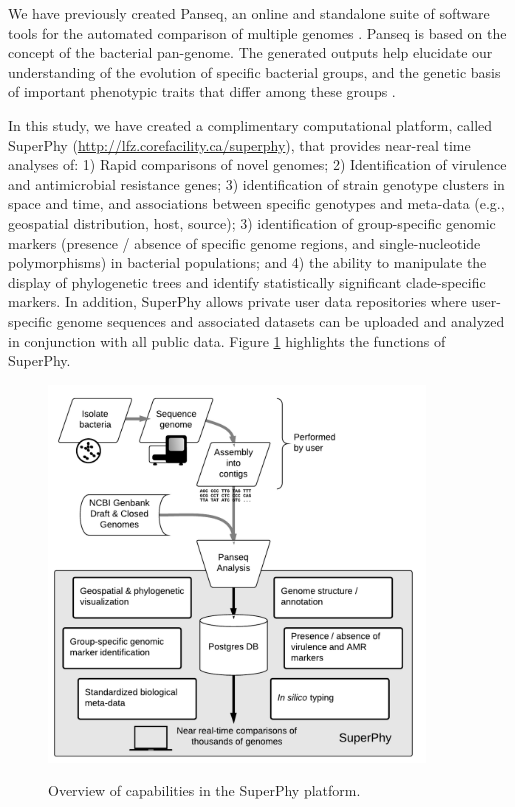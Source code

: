 \documentclass[a4paper,twoside]{article}
\begin{document}
We have previously created Panseq, an online and standalone suite of software tools for the automated comparison of multiple genomes \cite{laing_pan-genome_2010,laing_identification_2011}. Panseq is based on the concept of the bacterial pan-genome. The generated outputs help elucidate our understanding of the evolution of specific bacterial groups, and the genetic basis of important phenotypic traits that differ among these groups \cite{laing_pan-genome_2010}.

In this study, we have created a complimentary computational platform, called SuperPhy (\url{http://lfz.corefacility.ca/superphy}), that provides near-real time analyses of: 1) Rapid comparisons of novel genomes; 2) Identification of virulence and antimicrobial resistance genes; 3) identification of strain genotype clusters in space and time, and associations between specific genotypes and meta-data (e.g., geospatial distribution, host, source); 3) identification of group-specific genomic markers (presence / absence of specific genome regions, and single-nucleotide polymorphisms) in bacterial populations; and 4) the ability to manipulate the display of phylogenetic trees and identify statistically significant clade-specific markers. In addition, SuperPhy allows private user data repositories where user-specific genome sequences and associated datasets can be uploaded and analyzed in conjunction with all public data. Figure \ref{fig:capabilities} highlights the functions of SuperPhy.

\begin{figure}[t]
  \vspace{-0.2cm}
  \centering
   {\includegraphics[width=10cm]{capabilities.pdf}}
  \caption{Overview of capabilities in the SuperPhy platform.}
  \label{fig:capabilities}
\end{figure}
\end{document}
